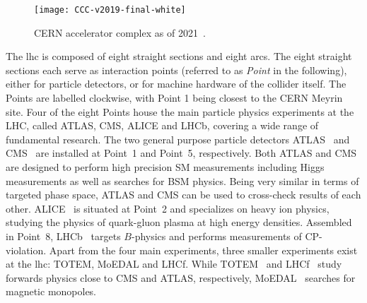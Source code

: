 \begin{figure}
	\centering    
	\texttt{[image: CCC-v2019-final-white]}
	\caption[CERN accelerator complex]{CERN accelerator complex as of 2021~\cite{Mobs:2684277}.}
	\label{fig:accelerator_complex}
\end{figure}

The \gls{lhc} is composed of eight straight sections and eight arcs. The eight straight sections each serve as interaction points (referred to as \textit{Point} in the following), either for particle detectors, or for machine hardware of the collider itself.
The Points are labelled clockwise, with Point 1 being closest to the CERN Meyrin site.
Four of the eight Points house the main particle physics experiments at the LHC, called ATLAS, CMS, ALICE and LHCb, covering a wide range of fundamental research.
The two general purpose particle detectors ATLAS~\cite{Aad:2008zzm} and CMS~\cite{Chatrchyan:2008aa} are installed at Point~1 and Point~5, respectively.
Both ATLAS and CMS are designed to perform high precision SM measurements including Higgs measurements as well as searches for BSM physics. Being very similar in terms of targeted phase space, ATLAS and CMS can be used to cross-check results of each other.
ALICE~\cite{Aamodt:2008zz} is situated at Point~2 and specializes on heavy ion physics, studying the physics of quark-gluon plasma at high energy densities. Assembled in Point~8, LHCb~\cite{Alves:2008zz} targets $B$-physics and performs measurements of CP-violation.
Apart from the four main experiments, three smaller experiments exist at the \gls{lhc}: TOTEM, MoEDAL and LHCf.
While TOTEM~\cite{Anelli:2008zza} and LHCf~\cite{Adriani:2006jd} study forwards physics close to CMS and ATLAS, respectively, MoEDAL~\cite{Pinfold:2009oia} searches for magnetic monopoles.


